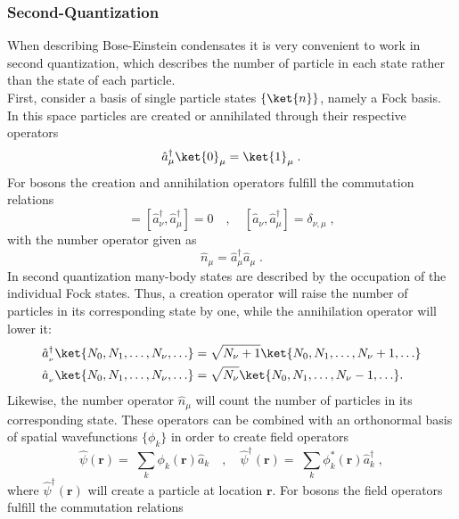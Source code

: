 \subsubsection{Second-Quantization}
When describing Bose-Einstein condensates it is very convenient to work in second quantization, which describes the number of particle in each state rather than the state of each particle.\\
First, consider a basis of single particle states $\{ \ket{n} \}$, namely a Fock basis. In this space particles are created or annihilated through their respective operators
\begin{equation}
	\hat{a}_{\mu}^{\dag} \ket{0}_\mu = \ket{1}_\mu \; .
\end{equation}
For bosons the creation and annihilation operators fulfill the commutation relations
\begin{equation}
[\hat{a}_\nu,\hat{a}_\mu]=[\hat{a}_\nu^\dagger,\hat{a}_\mu^\dagger]=0 \quad , \quad [\hat{a}_\nu,\hat{a}_\mu^\dagger]=\delta_{\nu,\mu} \; , 
\end{equation}
with the number operator given as
\begin{equation}
	\hat{n}_{\mu} = \hat{a}_{\mu}^{\dag} \hat{a}_{\mu} \; .
\end{equation}
In second quantization many-body states are described by the occupation of the individual Fock states. Thus, a creation operator will raise the number of particles in its corresponding state by one, while the annihilation operator will lower it:
\begin{align}
\hat{a}_{_\nu}^\dagger \ket{N_0,N_1, \ldots , N_{\nu},\ldots}&= \sqrt{N_\nu+1}\ket{N_0,N_1, \ldots , N_{\nu}+1,\ldots} \\
\hat{a}_{_\nu} \ket{N_0,N_1, \ldots , N_{\nu},\ldots}&= \sqrt{N_\nu}\ket{N_0,N_1, \ldots , N_{\nu}-1,\ldots} .
\end{align}
Likewise, the number operator $\hat{n}_{\mu}$ will count the number of particles in its corresponding state. These operators can be combined with an orthonormal basis of spatial wavefunctions $\{ \phi_k \}$ in order to create field operators
\begin{equation}
	\hat{\psi}(\boldsymbol{r}) = \; \sum_{k} \phi_k (\boldsymbol{r}) \hat{a}_{k} \quad , \quad \hat{\psi}^{\dag}(\boldsymbol{r}) = \; \sum_{k} \phi_{k}^{*} (\boldsymbol{r}) \hat{a}_{k}^{\dag} \; ,
\end{equation}
where $\hat{\psi}^{\dagger}(\boldsymbol{r})$ will create a particle at location $\boldsymbol{r}$. For bosons the field operators fulfill the commutation relations \cite{bruus}
